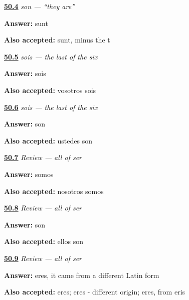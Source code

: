 \noindent\begin{minipage}[t]{\linewidth}
\raggedright
\hyperlink{review-ES-C09-son-latin}{\textbf{50.4}} \emph{son — \textquotedblleft{}they are\textquotedblright{}}\par
\small \textbf{Answer:} sunt\par
\footnotesize \textbf{Also accepted:} sunt, minus the t
\end{minipage}\par\medskip

\noindent\begin{minipage}[t]{\linewidth}
\raggedright
\hyperlink{review-ES-C09-sois-form}{\textbf{50.5}} \emph{sois — the last of the six}\par
\small \textbf{Answer:} sois\par
\footnotesize \textbf{Also accepted:} vosotros sois
\end{minipage}\par\medskip

\noindent\begin{minipage}[t]{\linewidth}
\raggedright
\hyperlink{review-ES-C09-sois-where}{\textbf{50.6}} \emph{sois — the last of the six}\par
\small \textbf{Answer:} son\par
\footnotesize \textbf{Also accepted:} ustedes son
\end{minipage}\par\medskip

\noindent\begin{minipage}[t]{\linewidth}
\raggedright
\hyperlink{review-ES-C09-repaso-ser-we}{\textbf{50.7}} \emph{Review — all of ser}\par
\small \textbf{Answer:} somos\par
\footnotesize \textbf{Also accepted:} nosotros somos
\end{minipage}\par\medskip

\noindent\begin{minipage}[t]{\linewidth}
\raggedright
\hyperlink{review-ES-C09-repaso-ser-they}{\textbf{50.8}} \emph{Review — all of ser}\par
\small \textbf{Answer:} son\par
\footnotesize \textbf{Also accepted:} ellos son
\end{minipage}\par\medskip

\noindent\begin{minipage}[t]{\linewidth}
\raggedright
\hyperlink{review-ES-C09-repaso-ser-odd}{\textbf{50.9}} \emph{Review — all of ser}\par
\small \textbf{Answer:} eres, it came from a different Latin form\par
\footnotesize \textbf{Also accepted:} eres; eres - different origin; eres, from eris
\end{minipage}\par\medskip


